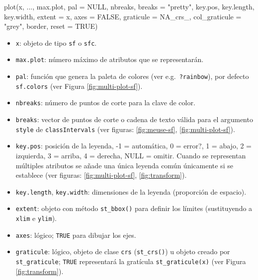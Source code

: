 \documentclass[
  spanish,
]{book}
\newenvironment{Shaded}{\begin{snugshade}}{\end{snugshade}}
\newcommand{\AttributeTok}[1]{\textcolor[rgb]{0.77,0.63,0.00}{#1}}
\newcommand{\ConstantTok}[1]{\textcolor[rgb]{0.00,0.00,0.00}{#1}}
\newcommand{\FunctionTok}[1]{\textcolor[rgb]{0.00,0.00,0.00}{#1}}
\newcommand{\NormalTok}[1]{#1}
\newcommand{\StringTok}[1]{\textcolor[rgb]{0.31,0.60,0.02}{#1}}
\providecommand{\tightlist}{%
  \setlength{\itemsep}{0pt}\setlength{\parskip}{0pt}}
\theoremstyle{break}
\theoremstyle{definition}
\theoremstyle{definition}
\theoremstyle{definition}
\theoremstyle{definition}
\theoremstyle{remark}
\begin{document}
\begin{Shaded}
\begin{Highlighting}[]
\FunctionTok{plot}\NormalTok{(x, ..., max.plot, }\AttributeTok{pal =} \ConstantTok{NULL}\NormalTok{, nbreaks, }\AttributeTok{breaks =} \StringTok{"pretty"}\NormalTok{, }
\NormalTok{     key.pos, key.length, key.width, }\AttributeTok{extent =}\NormalTok{ x, }\AttributeTok{axes =} \ConstantTok{FALSE}\NormalTok{, }
     \AttributeTok{graticule =}\NormalTok{ NA\_crs\_, }\AttributeTok{col\_graticule =} \StringTok{"grey"}\NormalTok{, border, }\AttributeTok{reset =} \ConstantTok{TRUE}\NormalTok{)}
\end{Highlighting}
\end{Shaded}

\begin{itemize}
\tightlist
\item
  \texttt{x}: objeto de tipo \texttt{sf} o \texttt{sfc}.
\item
  \texttt{max.plot}: número máximo de atributos que se representarán.
\item
  \texttt{pal}: función que genera la paleta de colores (ver e.g.~\texttt{?rainbow}), por defecto \texttt{sf.colors} (ver Figura \ref{fig:multi-plot-sf}).
\item
  \texttt{nbreaks}: número de puntos de corte para la clave de color.
\item
  \texttt{breaks}: vector de puntos de corte o cadena de texto válida para el argumento \texttt{style} de \texttt{classIntervals} (ver figuras: \ref{fig:meuse-sf}, \ref{fig:multi-plot-sf}).
\item
  \texttt{key.pos}: posición de la leyenda, -1 = automática, 0 = error?, 1 = abajo, 2 = izquierda, 3 = arriba, 4 = derecha, NULL = omitir. Cuando se representan múltiples atributos se añade una única leyenda común únicamente si se establece (ver figuras: \ref{fig:multi-plot-sf}, \ref{fig:transform}).
\item
  \texttt{key.length}, \texttt{key.width}: dimensiones de la leyenda (proporción de espacio).
\item
  \texttt{extent}: objeto con método \texttt{st\_bbox()} para definir los límites (sustituyendo a \texttt{xlim} e \texttt{ylim}).
\item
  \texttt{axes}: lógico; \texttt{TRUE} para dibujar los ejes.
\item
  \texttt{graticule}: lógico, objeto de clase \texttt{crs} (\texttt{st\_crs()}) u objeto creado por \texttt{st\_graticule}; \texttt{TRUE} representará la gratícula \texttt{st\_graticule(x)} (ver Figura \ref{fig:transform}).

\end{itemize}
\end{document}
